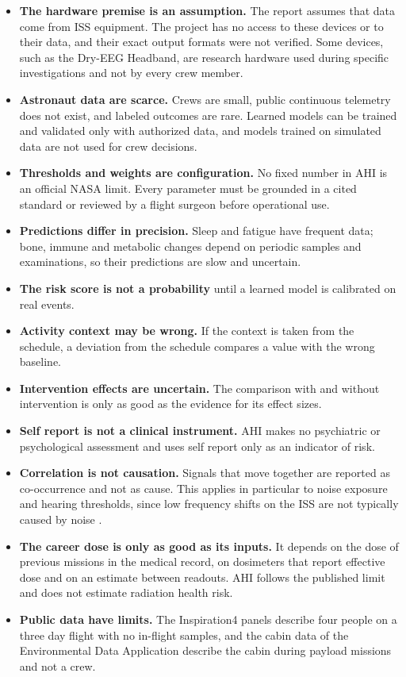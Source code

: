 \begin{itemize}
\item \textbf{The hardware premise is an assumption.} The report assumes that data come from ISS equipment. The project has no access to these devices or to their data, and their exact output formats were not verified. Some devices, such as the Dry-EEG Headband, are research hardware used during specific investigations and not by every crew member.
\item \textbf{Astronaut data are scarce.} Crews are small, public continuous telemetry does not exist, and labeled outcomes are rare. Learned models can be trained and validated only with authorized data, and models trained on simulated data are not used for crew decisions.
\item \textbf{Thresholds and weights are configuration.} No fixed number in AHI is an official NASA limit. Every parameter must be grounded in a cited standard or reviewed by a flight surgeon before operational use.
\item \textbf{Predictions differ in precision.} Sleep and fatigue have frequent data; bone, immune and metabolic changes depend on periodic samples and examinations, so their predictions are slow and uncertain.
\item \textbf{The risk score is not a probability} until a learned model is calibrated on real events.
\item \textbf{Activity context may be wrong.} If the context is taken from the schedule, a deviation from the schedule compares a value with the wrong baseline.
\item \textbf{Intervention effects are uncertain.} The comparison with and without intervention is only as good as the evidence for its effect sizes.
\item \textbf{Self report is not a clinical instrument.} AHI makes no psychiatric or psychological assessment and uses self report only as an indicator of risk.
\item \textbf{Correlation is not causation.} Signals that move together are reported as co-occurrence and not as cause. This applies in particular to noise exposure and hearing thresholds, since low frequency shifts on the ISS are not typically caused by noise \cite{coste2024hearing}.
\item \textbf{The career dose is only as good as its inputs.} It depends on the dose of previous missions in the medical record, on dosimeters that report effective dose and on an estimate between readouts. AHI follows the published limit and does not estimate radiation health risk.
\item \textbf{Public data have limits.} The Inspiration4 panels describe four people on a three day flight with no in-flight samples, and the cabin data of the Environmental Data Application describe the cabin during payload missions and not a crew.
\end{itemize}

